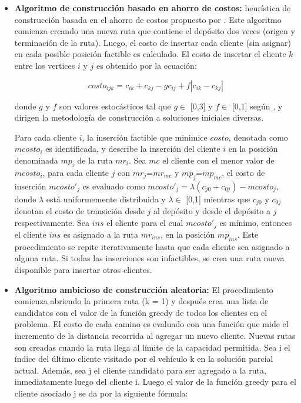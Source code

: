 \begin{itemize}
\item \textbf{Algoritmo de construcción basado en ahorro de costos:} heurística de construcción basada en el ahorro de costos propuesto por \cite{savings}. Este algoritmo comienza creando una nueva ruta que contiene el depósito dos veces (origen y terminación de la ruta). Luego, el costo de insertar cada cliente (sin asignar) en cada posible posición factible es calculado. El costo de insertar el cliente $k$ entre los vertices $i$ y $j$ es obtenido por la ecuación:

\begin{equation}\label{eq:cost_savings}
costo_{ijk} = c_{ik} + c_{kj} - gc_{ij} + f|c_{ik} - c_{kj}|
\end{equation}

donde $g$ y $f$ son valores estocásticos tal que $g\in$ [0,3] y $f\in$ [0,1] según \cite{savings}, y dirigen la metodología de construcción a soluciones iniciales diversas.

Para cada cliente $i$, la inserción factible que minimice $costo$, denotada como $mcosto_i$ es identificada, y describe la inserción del cliente $i$ en la posición denominada $mp_i$ de la ruta $mr_i$. Sea $mc$ el cliente con el menor valor de $mcosto_i$, para cada cliente $j$ con $mr_j$=$mr_{mc}$ y $mp_j$=$mp_{mc}$, el costo de inserción $mcosto'_j$ es evaluado como $mcosto'_j=\lambda(c_{j0} + c_{0j}) - mcosto_j$, donde $\lambda$ está uniformemente distribuida y $\lambda\in$ [0,1] mientras que $c_{j0}$ y $c_{0j}$ denotan el costo de transición desde $j$ al depósito y desde el depósito a $j$ respectivamente. Sea $ins$ el cliente para el cual $mcosto'_j$ es mínimo, entonces el cliente $ins$ es asignado a la ruta $mr_{ins}$, en la posición $mp_{ins}$. Este procedimiento se repite iterativamente hasta que cada cliente sea asignado a alguna ruta. Si todas las inserciones son infactibles, se crea una ruta nueva disponible para insertar otros clientes.

\item \textbf{Algoritmo ambicioso de construcción aleatoria:} El procedimiento comienza abriendo la primera ruta (k = 1) y después crea una lista de candidatos con el valor de la función greedy de todos los clientes en el problema. El costo de cada camino es evaluado con una función que mide el incremento de la distancia recorrida al agregar un nuevo cliente. Nuevas rutas son creadas cuando la ruta llega al límite de la capacidad permitida.  Sea i el índice del último cliente visitado por el vehículo k en la solución parcial actual. Además, sea j el cliente candidato para ser agregado a la ruta, inmediatamente luego del cliente i. Luego el valor de la función greedy para el cliente asociado j se da por la siguiente fórmula:
  	

\end{itemize}
